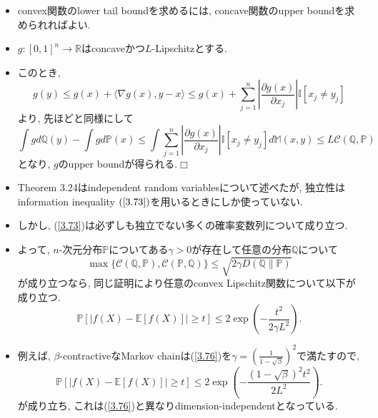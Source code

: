 \documentclass[aspectratio=169, dvipdfmx]{beamer}
\def\qed{\hfill $\Box$}
\newcommand{\ex}{\mathbb{E}}
\newcommand{\bb}{\mathbb}
\newcommand{\cc}{\mathcal}
\begin{document}
\begin{frame}
\begin{itemize}
    \item convex関数のlower tail boundを求めるには, concave関数のupper boundを求められればよい.
    \item $g:[0,1]^n \to \bb{R}$はconcaveかつ$L$-Lipschitzとする.
    \item このとき,
    \[
        g(y)
        \le g(x) + \langle\nabla g(x), y-x \rangle
        \le g(x) + \sum_{j=1}^n \left|\frac{\partial g(x)}{\partial x_j}\right|\bb{I}[x_j \ne y_j]
    \]
    より, 先ほどと同様にして
    \[
        \int g d\bb{Q}(y) - \int g d\bb{P}(x)
        \le \int \sum_{j=1}^n \left|\frac{\partial g(x)}{\partial x_j}\right|\bb{I}[x_j \ne y_j]d\bb{M}(x, y)
        \le L \cc{C}(\bb{Q}, \bb{P})
    \]
     となり, $g$のupper boundが得られる.\qed
\end{itemize}
\end{frame}

\begin{frame}
\begin{itemize}
    \item Theorem 3.24はindependent random variablesについて述べたが,
          独立性はinformation inequality $(\ref{3.73})$を用いるときにしか使っていない.
    \item しかし, (\ref{3.73})は必ずしも独立でない多くの確率変数列について成り立つ.
    \item よって, $n$-次元分布$\bb{P}$についてある$\gamma > 0$が存在して任意の分布$\bb{Q}$について
    \[
        \max\{\cc{C}(\bb{Q}, \bb{P}), \cc{C}(\bb{P}, \bb{Q})\}
        \le \sqrt{2 \gamma D(\bb{Q} \| \bb{P})}
        \tag{3.76}\label{3.76}
    \]
    が成り立つなら, 同じ証明により任意のconvex Lipschitz関数について以下が成り立つ.
    \[
        \bb{P}[|f(X) - \ex[f(X)]| \ge t] \le 2 \exp\left( - \frac{t^2}{2\gamma L^2}\right).
        \label{3.77}\tag{3.77} 
    \]
    \item 例えば, $\beta$-contractiveなMarkov chainは(\ref{3.76})を$\gamma =\left(\frac{1}{1-\sqrt{\beta}}\right)^2$で満たすので,
    \[
        \bb{P}[|f(X) - \ex[f(X)]| \ge t] \le 2 \exp\left( - \frac{ (1 - \sqrt{\beta})^2 t^2}{2 L^2}\right).
        \label{3.78}\tag{3.78} 
    \]
    が成り立ち, これは(\ref{3.76})と異なりdimension-independentとなっている.
\end{itemize}
\end{frame}
\end{document}
